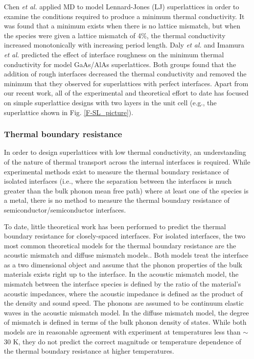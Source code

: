 \documentclass[letterpaper,12pt]{article}
\begin{document}
Chen \textit{et al.} \cite{chen2005} applied MD to model
Lennard-Jones (LJ) superlattices in order to examine the conditions
required to produce a minimum thermal conductivity. It was found
that a minimum exists when there is no lattice mismatch, but when
the species were given a lattice mismatch of 4\%, the thermal
conductivity increased monotonically with increasing period length.
Daly \textit{et al.} \cite{daly2002} and Imamura \textit{et al.}
\cite{imamura2003} predicted the effect of interface roughness on
the minimum thermal conductivity for model GaAs/AlAs superlattices.
Both groups found that the addition of rough interfaces decreased
the thermal conductivity and removed the minimum that they observed
for superlattices with perfect interfaces. Apart from our recent
work,\cite{landry2008a} all of the experimental and theoretical
effort to date has focused on simple superlattice designs with two
layers in the unit cell (e.g., the superlattice shown in Fig.
\ref{F-SL_picture}).

\subsubsection*{Thermal boundary resistance}

In order to design superlattices with low thermal conductivity, an
understanding of the nature of thermal transport across the internal
interfaces is required. While experimental methods exist to measure
the thermal boundary resistance of isolated interfaces (i.e., where
the separation between the interfaces is much greater than the bulk
phonon mean free path) where at least one of the species is a metal,
there is no method to measure the thermal boundary resistance of
semiconductor/semiconductor
interfaces.\cite{costescu2003,stevens2005}

To date, little theoretical work has been performed to predict the
thermal boundary resistance for closely-spaced interfaces. For
isolated interfaces, the two most common theoretical models for the
thermal boundary resistance are the acoustic mismatch and diffuse
mismatch models.\cite{swartz1989}. Both models treat the interface
as a two dimensional object and assume that the phonon properties of
the bulk materials exists right up to the interface. In the acoustic
mismatch model, the mismatch between the interface species is
defined by the ratio of the material's acoustic impedances, where
the acoustic impedance is defined as the product of the density and
sound speed. The phonons are assumed to be continuum elastic waves
in the acoustic mismatch model. In the diffuse mismatch model, the
degree of mismatch is defined in terms of the bulk phonon density of
states. While both models are in reasonable agreement with
experiment at temperatures less than $\sim$30 K, they do not predict
the correct magnitude or temperature dependence of the thermal
boundary resistance at higher temperatures.\cite{swartz1989}
\end{document}
